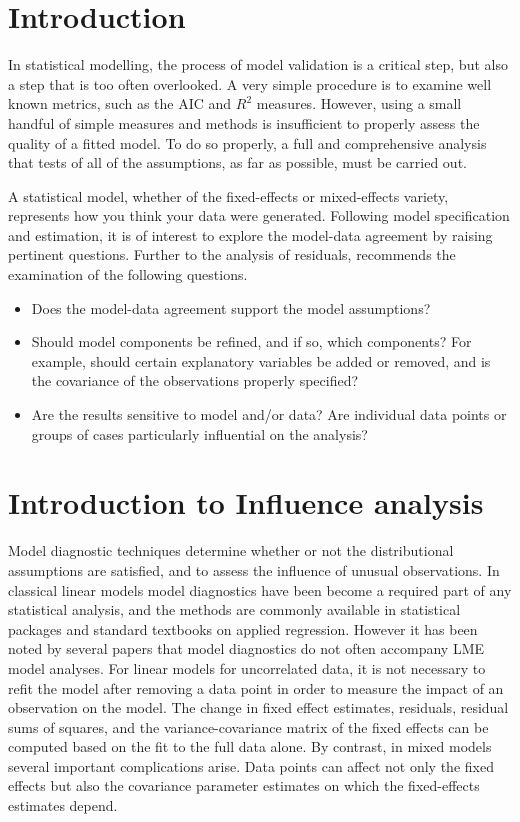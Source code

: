 \documentclass[Main.tex]{subfiles}
\begin{document}
\section{Introduction}
In statistical modelling, the process of model validation is a critical step, but also a step that is too often overlooked. A very simple procedure is to examine well known
metrics, such as the AIC and $R^2$ measures. However, using a small handful of simple measures and methods is insufficient to properly assess the quality of a fitted model. To do so properly, a full and comprehensive
analysis that tests of all of the assumptions, as far as possible, must be carried out. 

A statistical model, whether of the fixed-effects or mixed-effects variety, represents how you think your data were generated. Following model specification and estimation, it is of interest to explore the model-data
agreement by raising pertinent questions. Further to the analysis of residuals, \citet{schab} recommends the examination of the following questions.
\begin{itemize}
	\item Does the model-data agreement support the model assumptions?
	\item Should model components be refined, and if so, which components? For example, should certain explanatory variables
	be added or removed, and is the covariance of the observations properly specified?
	\item Are the results sensitive to model and/or data? Are individual data points or groups of cases particularly
	influential on the analysis?
\end{itemize}
\newpage

\section{Introduction to Influence analysis} %
 Model diagnostic techniques determine whether or not the distributional assumptions are satisfied, and to assess the influence of unusual observations. In classical linear models model diagnostics have been become a required part of any statistical analysis, and the methods are commonly available in statistical packages and standard textbooks on applied regression. However it has been noted by several papers that model diagnostics do not often accompany LME model analyses.
For linear models for uncorrelated data, it is not necessary to refit the model after removing a data point in order to measure the impact of an observation on the model. The change in fixed effect estimates, residuals, residual sums of squares, and the variance-covariance matrix of the fixed effects can be computed based on the fit to the full data alone. By contrast, in mixed models several important complications arise. Data points can affect not only the fixed effects but also the covariance parameter estimates on which the fixed-effects estimates depend. 
\end{document}
